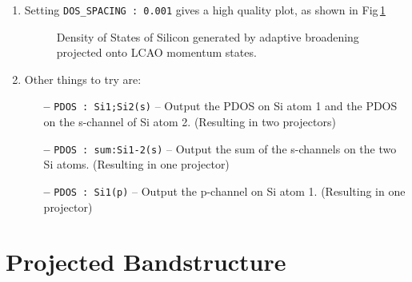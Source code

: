 \documentclass[a4paper,11pt,twoside]{book}
\begin{document}
{\begin{enumerate}
\verb#xmgrace -nxy Si2.pdos.dat#

\item Setting {\tt DOS\_SPACING : 0.001} gives a high quality plot, as shown in Fig\,\ref{fig:Si2_PDOS}

\begin{figure}[h]
\begin{center}
\caption{Density of States of Silicon generated by adaptive broadening projected onto LCAO momentum states.}
\label{fig:Si2_PDOS}
\end{center}
\end{figure}


\item Other things to try are:
\begin{itemize}
\item[{\bf --}]  \verb#PDOS : Si1;Si2(s)#  -- Output the PDOS on Si atom 1 and the PDOS on the s-channel of Si atom 2. (Resulting in two projectors)
\item[{\bf --}]  \verb#PDOS : sum:Si1-2(s)#  --  Output the sum of the s-channels on the two Si atoms. (Resulting in one projector)
\item[{\bf --}]  \verb#PDOS : Si1(p)# -- Output the p-channel on Si atom 1. (Resulting in one projector)
\end{itemize}
\end{enumerate}

\section{Projected Bandstructure}

}
\end{document}
